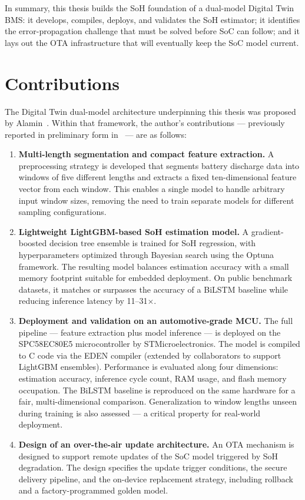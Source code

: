 In summary, this thesis builds the SoH foundation of a dual-model Digital Twin BMS: it develops, compiles, deploys, and validates the SoH estimator; it identifies the error-propagation challenge that must be solved before SoC can follow; and it lays out the OTA infrastructure that will eventually keep the SoC model current.


\section{Contributions}

The Digital Twin dual-model architecture underpinning this thesis was proposed by Alamin~\autocite{Alamin2022}. Within that framework, the author's contributions --- previously reported in preliminary form in~\autocite{song2025icecs} --- are as follows:

\begin{enumerate}
    \item \textbf{Multi-length segmentation and compact feature extraction.} A preprocessing strategy is developed that segments battery discharge data into windows of five different lengths and extracts a fixed ten-dimensional feature vector from each window. This enables a single model to handle arbitrary input window sizes, removing the need to train separate models for different sampling configurations.

    \item \textbf{Lightweight LightGBM-based SoH estimation model.} A gradient-boosted decision tree ensemble is trained for SoH regression, with hyperparameters optimized through Bayesian search using the Optuna framework. The resulting model balances estimation accuracy with a small memory footprint suitable for embedded deployment. On public benchmark datasets, it matches or surpasses the accuracy of a BiLSTM baseline while reducing inference latency by 11--31$\times$.

    \item \textbf{Deployment and validation on an automotive-grade MCU.} The full pipeline — feature extraction plus model inference — is deployed on the SPC58EC80E5 microcontroller by STMicroelectronics. The model is compiled to C code via the EDEN compiler (extended by collaborators to support LightGBM ensembles). Performance is evaluated along four dimensions: estimation accuracy, inference cycle count, RAM usage, and flash memory occupation. The BiLSTM baseline is reproduced on the same hardware for a fair, multi-dimensional comparison. Generalization to window lengths unseen during training is also assessed — a critical property for real-world deployment.

    \item \textbf{Design of an over-the-air update architecture.} An OTA mechanism is designed to support remote updates of the SoC model triggered by SoH degradation. The design specifies the update trigger conditions, the secure delivery pipeline, and the on-device replacement strategy, including rollback and a factory-programmed golden model.
\end{enumerate}



